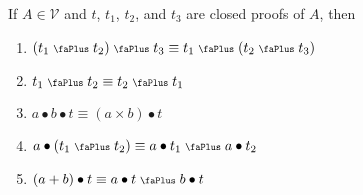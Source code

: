 \documentclass[screen, sigconf,authorversion,nonacm]{acmart}
\theoremstyle{acmdefinition}
\numberwithin{equation}{section}
\newcommand\plus{\mathrel{\text{\normalfont\scalebox{0.7}{\faPlus}}}}
\begin{document}
\begin{lemma} \label{vecstructure}
  If $A \in {\mathcal V}$ and $t$, $t_1$, $t_2$, and $t_3$ are closed proofs of
  $A$, then
    \begin{enumerate}
      \item $(t_1 \plus t_2) \plus t_3 \equiv t_1 \plus (t_2 \plus t_3)$
      \item $t_1 \plus t_2 \equiv t_2 \plus t_1$
      \item $a \bullet b \bullet t \equiv (a \times b) \bullet t$
      \item $a \bullet (t_1 \plus t_2) \equiv a \bullet t_1 \plus a \bullet t_2$
      \item $(a + b) \bullet t \equiv a \bullet t \plus b \bullet t$
    \end{enumerate}
\end{lemma}
\end{document}
